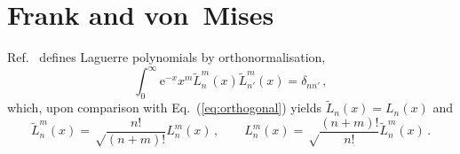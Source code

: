 \documentclass[a4paper,12pt,final]{article}
\def\e{\mathrm{e}}
\begin{document}
\section{Frank and von~Mises}
Ref.\ \cite{FM} defines Laguerre polynomials by orthonormalisation,
\begin{equation}
 \label{eq:FMorthogonal}
 \int_0^\infty \e^{-x}x^m{\tilde L}_n^m(x) {\tilde L}_{n'}^m(x) = \delta_{nn'}\,,
\end{equation}
which, upon comparison with Eq.\ (\ref{eq:orthogonal}) yields ${\tilde L}_n (x)= L_n(x)$ and
\begin{equation}
 \label{eq:FMidentify}
 {\tilde L}_n^m(x) = \sqrt\frac{n!}{(n+m)!} L_n^m(x)\,,\quad\quad L_n^m(x) = \sqrt\frac{(n+m)!}{n!} {\tilde L}_n^m(x)\,.
\end{equation}
\end{document}
